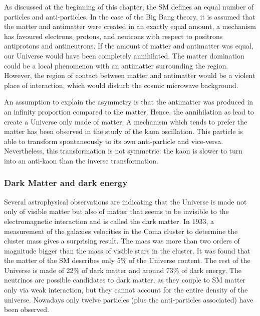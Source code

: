     As discussed at the beginning of this chapter, the \gls{SM} defines an equal number of particles and anti-particles. 
    In the case of the Big Bang theory, it is assumed that the matter and antimatter were created in an exactly equal amount, a mechanism has favoured electrons, protons, and neutrons with respect to positrons antiprotons and antineutrons.
    If the amount of matter and antimatter was equal, our Universe would have been completely annihilated.
    The matter domination could be a local phenomenon with an antimatter surrounding the region. 
    However, the region of contact between matter and antimatter would be a violent place of interaction, which would disturb the cosmic microwave background.

    An assumption to explain the asymmetry is that the antimatter was produced in an infinity proportion compared to the matter.
    Hence, the annihilation as lead to create a Universe only made of matter.
    A mechanism which tends to prefer the matter has been observed in the study of the kaon oscillation.
    This particle is able to transform spontaneously to its own anti-particle and vice-versa.
    Nevertheless, this transformation is not symmetric: the kaon is slower to turn into an anti-kaon than the inverse transformation.
 
    \subsubsection{Dark Matter and dark energy}
    
    Several astrophysical observations are indicating that the Universe is made not only of visible matter but also of matter that seems to be invisible to the electromagnetic interaction and is called the dark matter.
    In 1933, a measurement of the galaxies velocities in the Coma cluster to determine the cluster mass gives a surprising result.
    The mass was more than two orders of magnitude bigger than the mass of visible stars in the cluster.
    It was found that the matter of the \gls{SM} describes only 5\% of the Universe content. 
    The rest of the Universe is made of 22\% of dark matter and around 73\% of dark energy.
    The neutrinos are possible candidates to dark matter, as they couple to \gls{SM} matter only via weak interaction, but they cannot account for the entire density of the universe.
    Nowadays only twelve particles (plus the anti-particles associated) have been observed. 

